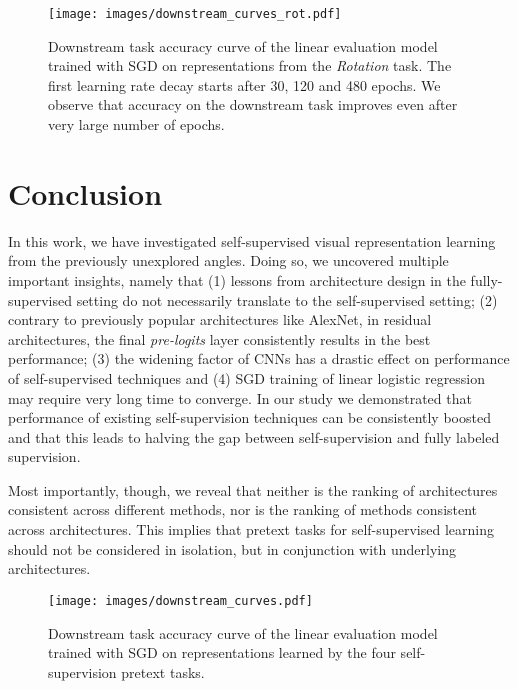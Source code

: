 \documentclass[10pt,twocolumn,letterpaper]{article}
\begin{document}
\begin{figure}[t]
  \begin{center}
    \texttt{[image: images/downstream\_curves\_rot.pdf]}
  \end{center}
  \caption{
     Downstream task accuracy curve of the linear evaluation model trained with SGD on representations from the \emph{Rotation} task.
     The first learning rate decay starts after 30, 120 and 480 epochs.
     We observe that accuracy on the downstream task improves even after very large number of epochs. 
  }\label{fig:downstream_curves_rot}
\end{figure}


\section{Conclusion}\label{sec:conclusion}

In this work, we have investigated self-supervised visual representation learning from the previously unexplored angles. 
Doing so, we uncovered multiple important insights, namely that (1) lessons from architecture design in the fully-supervised setting do not necessarily translate to the self-supervised setting; (2) contrary to previously popular architectures like AlexNet, in residual architectures, the final \emph{pre-logits} layer consistently results in the best performance; (3) the widening factor of CNNs has a drastic effect on performance of self-supervised techniques and (4) SGD training of linear logistic regression may require very long time to converge.
In our study we demonstrated that performance of existing self-supervision techniques can be consistently boosted and that this leads to halving the gap between self-supervision and fully labeled supervision.

Most importantly, though, we reveal that neither is the ranking of architectures consistent across different methods, nor is the ranking  of methods consistent across architectures.
This implies that pretext tasks for self-supervised learning should not be considered in isolation, but in conjunction with underlying architectures.

{\small


}


\clearpage
\appendix

\begin{figure*}[t]
  \begin{center}
    \texttt{[image: images/downstream\_curves.pdf]}
  \end{center}
  \caption{
     Downstream task accuracy curve of the linear evaluation model trained with SGD on representations learned by the four self-supervision pretext tasks.
  }\label{fig:downstream_curves}
\end{figure*}
\end{document}
